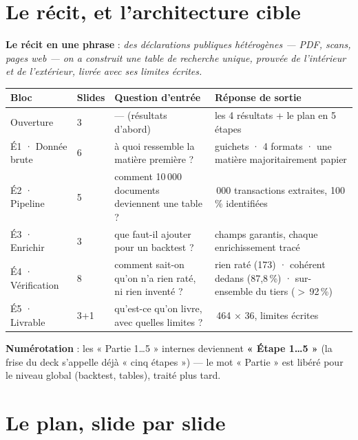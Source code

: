 \documentclass[11pt,a4paper]{article}
\begin{document}
\section{Le récit, et l'architecture cible}

\noindent\colorbox{helec!8}{\parbox{\dimexpr\linewidth-8pt}{
\textbf{Le récit en une phrase} : \emph{des déclarations publiques hétérogènes --- PDF, scans,
pages web --- on a construit une table de recherche unique, prouvée de l'intérieur et de
l'extérieur, livrée avec ses limites écrites.}}}

\vspace{2mm}
\begin{center}\small
\begin{tabular}{@{}l l >{\raggedright\arraybackslash}p{4.6cm} >{\raggedright\arraybackslash}p{4.9cm}@{}}
\toprule
\textbf{Bloc} & \textbf{Slides} & \textbf{Question d'entrée} & \textbf{Réponse de sortie} \\
\midrule
Ouverture        & 3 & --- (résultats d'abord)             & les 4 résultats + le plan en 5 étapes \\
É1 · Donnée brute & 6 & à quoi ressemble la matière première ? & 2 guichets · 4 formats · une matière majoritairement papier \\
É2 · Pipeline    & 5 & comment 10\,000 documents deviennent une table ? & 169\,000 transactions extraites, 100\,\% identifiées \\
É3 · Enrichir    & 3 & que faut-il ajouter pour un backtest ? & 12 champs garantis, chaque enrichissement tracé \\
É4 · Vérification & 8 & comment sait-on qu'on n'a rien raté, ni rien inventé ? & rien raté (173) · cohérent dedans (87,8\,\%) · sur-ensemble du tiers ($>$\,92\,\%) \\
É5 · Livrable    & 3+1 & qu'est-ce qu'on livre, avec quelles limites ? & 134\,464 × 36, limites écrites \\
\bottomrule
\end{tabular}
\end{center}

\noindent\textbf{Numérotation} : les « Partie 1…5 » internes deviennent \textbf{« Étape
1…5 »} (la frise du deck s'appelle déjà « cinq étapes ») --- le mot « Partie » est libéré
pour le niveau global (backtest, tables), traité plus tard.

\section{Le plan, slide par slide}
\end{document}
